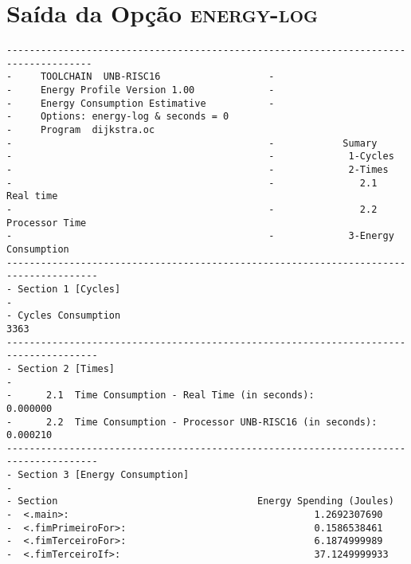 \section{Saída da Opção \textsc{energy-log}}
\scriptsize  
\begin{verbatim} 
-------------------------------------------------------------------------------------
-     TOOLCHAIN  UNB-RISC16                   -                                     
-     Energy Profile Version 1.00             -                                     
-     Energy Consumption Estimative           -                                     
-     Options: energy-log & seconds = 0
-     Program  dijkstra.oc
-                                             -            Sumary                                 
-                                             -             1-Cycles                     
-                                             -             2-Times                      
-                                             -               2.1    Real time           
-                                             -               2.2    Processor Time      
-                                             -             3-Energy Consumption         
--------------------------------------------------------------------------------------
- Section 1 [Cycles]                                                                      
-                                                                                         
- Cycles Consumption                                                   3363                 
--------------------------------------------------------------------------------------
- Section 2 [Times]                                                                       
-                                                                                         
-      2.1  Time Consumption - Real Time (in seconds):                 0.000000                 
-      2.2  Time Consumption - Processor UNB-RISC16 (in seconds):      0.000210                 
--------------------------------------------------------------------------------------
- Section 3 [Energy Consumption]                                                          
-                                                                                         
- Section                                   Energy Spending (Joules)
-  <.main>:                                           1.2692307690
-  <.fimPrimeiroFor>:                                 0.1586538461
-  <.fimTerceiroFor>:                                 6.1874999989
-  <.fimTerceiroIf>:                                  37.1249999933

\end{verbatim}

